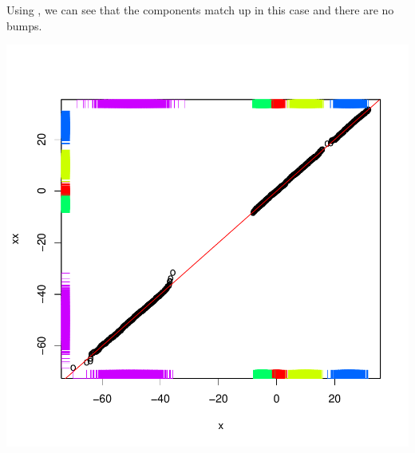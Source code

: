 Using , we can see that the components match up
in this case and there are no bumps.

\includegraphics{RNG/images/QQEqualCount.pdf}

